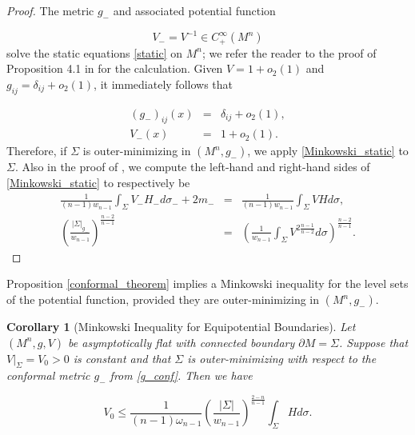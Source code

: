 \documentclass[12pt,twoside]{article}
\theoremstyle{plain}
\newtheorem{cor}[theorem]{Corollary}
\theoremstyle{definition}
\theoremstyle{remark}
\numberwithin{equation}{section}
\begin{document}
\begin{proof}
The metric $g_{-}$ and associated potential function

\begin{equation*}
    V_{-} = V^{-1} \in C^{\infty}_{+}(M^{n})
\end{equation*}
solve the static equations \eqref{static} on $M^{n}$; we refer the reader to the proof of Proposition 4.1 in \cite{HW} for the calculation. Given $V=1 + o_{2}(1)$ and $g_{ij}=\delta_{ij}+o_{2}(1)$, it immediately follows that

\begin{eqnarray*}
    (g_{-})_{ij}(x) &=& \delta_{ij} + o_{2}(1), \\
    V_{-}(x) &=& 1 + o_{2}(1).
\end{eqnarray*}
Therefore, if $\Sigma$ is outer-minimizing in $(M^{n},g_{-})$, we apply \eqref{Minkowski_static} to $\Sigma$. Also in the proof of \cite[Proposition 4.1]{HW}, we compute the left-hand and right-hand sides of \eqref{Minkowski_static} to respectively be
\begin{eqnarray*}
    \frac{1}{(n-1)w_{n-1}} \int_{\Sigma} V_{-} H_{-} d\sigma_{-} + 2m_{-} &=& \frac{1}{(n-1)w_{n-1}} \int_{\Sigma} VHd\sigma, \\
    \left( \frac{|\Sigma|_{g_{-}}}{w_{n-1}} \right)^{\frac{n-2}{n-1}} &=& \left( \frac{1}{w_{n-1}} \int_{\Sigma} V^{2 \frac{n-1}{n-2}} d\sigma \right)^{\frac{n-2}{n-1}}.
\end{eqnarray*}
\end{proof}
Proposition \ref{conformal_theorem} implies a Minkowski inequality for the level sets of the potential function, provided they are outer-minimizing in $(M^{n},g_{-})$.
\begin{cor}[Minkowski Inequality for Equipotential Boundaries] \label{equi_minkowski}
Let $(M^{n},g,V)$ be asymptotically flat  with connected boundary $\partial M= \Sigma$.  Suppose that $V|_{\Sigma} = V_{0} > 0$ is constant and that $\Sigma$ is outer-minimizing with respect to the conformal metric $g_{-}$ from \eqref{g_conf}. Then we have

\begin{equation} \label{equi}
    V_{0} \leq \frac{1}{(n-1)\omega_{n-1}} \left( \frac{|\Sigma|}{w_{n-1}} \right)^{\frac{2-n}{n-1}} \int_{\Sigma} H d\sigma.
\end{equation}
\end{cor}
\end{document}
